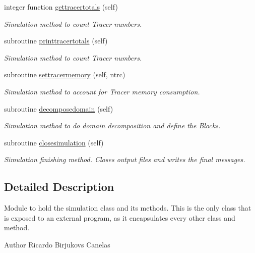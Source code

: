 \begin{DoxyCompactItemize}
integer function \mbox{\hyperlink{namespacesimulation__mod_a0ad485eab624ffa4df282f1da8d9f214}{gettracertotals}} (self)
\begin{DoxyCompactList}\small\item\em Simulation method to count Tracer numbers. \end{DoxyCompactList}\item 
subroutine \mbox{\hyperlink{namespacesimulation__mod_aba126a8e0575cabb3bef6ab395002b3c}{printtracertotals}} (self)
\begin{DoxyCompactList}\small\item\em Simulation method to count Tracer numbers. \end{DoxyCompactList}\item 
subroutine \mbox{\hyperlink{namespacesimulation__mod_acc5fa823c8dd599de8feda8988c224f2}{settracermemory}} (self, ntrc)
\begin{DoxyCompactList}\small\item\em Simulation method to account for Tracer memory consumption. \end{DoxyCompactList}\item 
subroutine \mbox{\hyperlink{namespacesimulation__mod_a2b8198a9fb3f7671c6b45192a0b9740c}{decomposedomain}} (self)
\begin{DoxyCompactList}\small\item\em Simulation method to do domain decomposition and define the Blocks. \end{DoxyCompactList}\item 
subroutine \mbox{\hyperlink{namespacesimulation__mod_a4285722eaa589fa671233554b54c74f8}{closesimulation}} (self)
\begin{DoxyCompactList}\small\item\em Simulation finishing method. Closes output files and writes the final messages. \end{DoxyCompactList}\end{DoxyCompactItemize}


\subsection{Detailed Description}
Module to hold the simulation class and its methods. This is the only class that is exposed to an external program, as it encapsulates every other class and method. 

\begin{DoxyAuthor}{Author}
Ricardo Birjukovs Canelas 
\end{DoxyAuthor}


